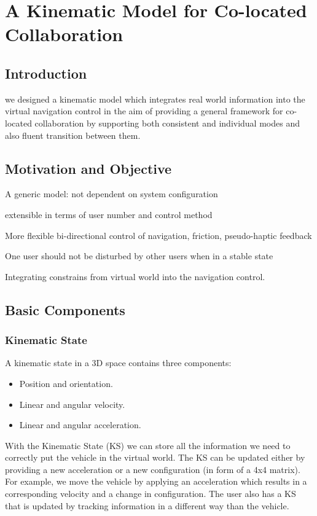 \chapter{A Kinematic Model for Co-located Collaboration}
\label{chapter:kinematic_model}
\minitoc

\section{Introduction}

we designed a kinematic model which integrates real world information into the virtual navigation control in the aim of providing a general framework for co-located collaboration by supporting both consistent and individual modes and also fluent transition between them.


\section{Motivation and Objective}
A generic model: not dependent on system configuration
 
extensible in terms of user number and control method

More flexible bi-directional control of navigation, friction, pseudo-haptic feedback

One user should not be disturbed by other users when in a stable state

Integrating constrains from virtual world into the navigation control.


\section{Basic Components}
\subsection{Kinematic State}
A kinematic state in a 3D space contains three components:
\begin{itemize}
  \item Position and orientation.
  \item Linear and angular velocity.
  \item Linear and angular acceleration.
\end{itemize}

With the Kinematic State (KS) we can store all the information we need to correctly put the vehicle in the virtual world. The KS can be updated either by providing a new acceleration or a new configuration (in form of a 4x4 matrix). For example, we move the vehicle by applying an acceleration which results in a corresponding velocity and a change in configuration. The user also has a KS that is updated by tracking information in a different way than the vehicle.

